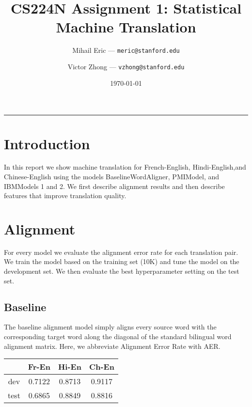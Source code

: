 \documentclass[12pt]{article}
\title{CS224N Assignment 1: Statistical Machine Translation}
\author{Mihail Eric --- \texttt{meric@stanford.edu}
    \and
    Victor Zhong --- \texttt{vzhong@stanford.edu}
}
\date{\today}
\begin{document}
\maketitle

\vspace{-0.3in}
\rule{\linewidth}{0.4pt}




\begin{multicols}{2}




\section{Introduction}
In this report we show machine translation for French-English, Hindi-English,and Chinese-English using the models BaselineWordAligner, PMIModel, and IBMModels 1 and 2. We first describe alignment results and then describe features that improve translation quality.




\section{Alignment}
For every model we evaluate the alignment error rate for each translation pair. We train the model based on the training set (10K) and tune the model on the development set. We then evaluate the best hyperparameter setting on the test set.


\subsection{Baseline}
The baseline alignment model simply aligns every source word with the
corresponding target word along the diagonal of the standard bilingual
word alignment matrix. Here, we abbreviate Alignment Error Rate with AER.\\

\begin{center}
\begin{tabular}{ c c c c }
    \hline
    & Fr-En & Hi-En & Ch-En  \\
    \hline
    dev & 0.7122 & 0.8713 & 0.9117 \\
    \hline
    test & 0.6865 & 0.8849 & 0.8816
\end{tabular}
\end{center}





\end{multicols}
\end{document}
